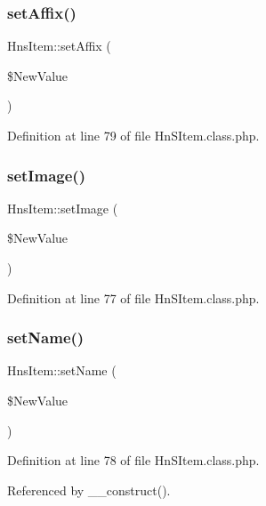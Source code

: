 \subsubsection{\texorpdfstring{set\+Affix()}{setAffix()}}
{\footnotesize\ttfamily Hns\+Item\+::set\+Affix (\begin{DoxyParamCaption}\item[{}]{\$\+New\+Value }\end{DoxyParamCaption})}



Definition at line 79 of file Hn\+S\+Item.\+class.\+php.

\mbox{\label{class_hns_item_a5d2645b1fd9a7add6562058d93abcc47}} 
\subsubsection{\texorpdfstring{set\+Image()}{setImage()}}
{\footnotesize\ttfamily Hns\+Item\+::set\+Image (\begin{DoxyParamCaption}\item[{}]{\$\+New\+Value }\end{DoxyParamCaption})}



Definition at line 77 of file Hn\+S\+Item.\+class.\+php.

\mbox{\label{class_hns_item_a347826422c7beca099e7e82c87e4348b}} 
\subsubsection{\texorpdfstring{set\+Name()}{setName()}}
{\footnotesize\ttfamily Hns\+Item\+::set\+Name (\begin{DoxyParamCaption}\item[{}]{\$\+New\+Value }\end{DoxyParamCaption})}



Definition at line 78 of file Hn\+S\+Item.\+class.\+php.



Referenced by \+\_\+\+\_\+construct().

